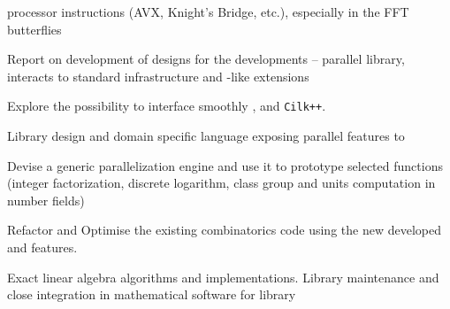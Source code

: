 \begin{workpackage}
\begin{wpdelivs}
\begin{wpdeliv}[due=18,miles=proto1,id=FFT,dissem=PU,nature=DEM, lead=UK]
{      processor instructions (AVX, Knight's Bridge, etc.), especially in the FFT
      butterflies}
\end{wpdeliv}
  \begin{wpdeliv}[due=18,miles=proto1,id=GAP-hpc-report,dissem=PU,nature=R,lead=SA]
    {Report on development of designs for the \GAP developments --
      parallel library, interacts to standard infrastructure and
      \Cython-like extensions }
  \end{wpdeliv}
  \begin{wpdeliv}[due=24,miles=proto1,id=cython-pythran-cilk,dissem=PU,nature=DEM,lead=PS]
      {Explore the possibility to interface smoothly \Pythran, \Cython and \texttt{Cilk++}.}
\end{wpdeliv}
  \begin{wpdeliv}[due=24,miles=proto1,id=LinBox-DSL,dissem=PU,nature=R,lead=UJF]
    {Library design and domain specific language exposing \Linbox parallel features to \Sage}
  \end{wpdeliv}
  \begin{wpdeliv}[due=24,id=pari-hpc1,dissem=PU,nature=DEM,lead=UB]
  {Devise a generic parallelization engine and use it to prototype selected functions (integer factorization,
  discrete logarithm, class group and units computation in number fields)}
  \end{wpdeliv}
  \begin{wpdeliv}[due=36,miles=community,id=sage-HPCcombi,dissem=PU,nature=DEM,lead=UB]
      {Refactor and Optimise the existing combinatorics \Sage code using the new developed \Pythran and \Cython features.}
  \end{wpdeliv}
  \begin{wpdeliv}[due=36,miles=community,id=LinBox-algo,dissem=PU,nature=DEM, lead=UJF]
    {Exact linear algebra algorithms and implementations. Library maintenance and close integration
      in mathematical software for \Linbox library}
  \end{wpdeliv}

\end{wpdelivs}
\end{workpackage}
